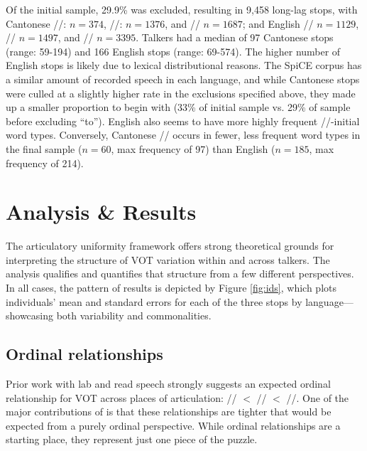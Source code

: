 Of the initial sample, 29.9\% was excluded, resulting in 9,458 long-lag stops, with Cantonese //: $n=374$, //: $n=1376$, and // $n=1687$; and English // $n=1129$, // $n=1497$, and // $n=3395$. Talkers had a median of 97 Cantonese stops (range: 59-194) and 166 English stops (range: 69-574). The higher number of English stops is likely due to lexical distributional reasons. The SpiCE corpus has a similar amount of recorded speech in each language, and while Cantonese stops were culled at a slightly higher rate in the exclusions specified above, they made up a smaller proportion to begin with (33\% of initial sample vs. 29\% of sample before excluding ``to''). English also seems to have more highly frequent //-initial word types. Conversely, Cantonese // occurs in fewer, less frequent word types in the final sample ($n=60$, max frequency of 97) than English ($n=185$, max frequency of 214).

\section{Analysis \& Results}
The articulatory uniformity framework offers strong theoretical grounds for interpreting the structure of VOT variation within and across talkers. The analysis qualifies and quantifies that structure from a few different perspectives. In all cases, the pattern of results is depicted by Figure \ref{fig:ids}, which plots individuals' mean and standard errors for each of the three stops by language---showcasing both variability and commonalities.

\subsection{Ordinal relationships}
Prior work with lab and read speech strongly suggests an expected ordinal relationship for VOT across places of articulation: // $<$ // $<$ //. One of the major contributions of \citep{chodroff_2017_structure} is that these relationships are tighter that would be expected from a purely ordinal perspective. While ordinal relationships are a starting place, they represent just one piece of the puzzle. 

